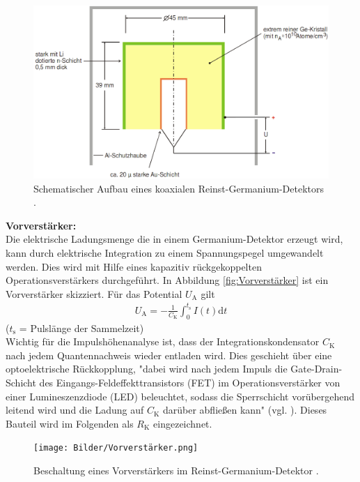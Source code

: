 \begin{figure}[H]
  \centering
  \includegraphics[width=0.9\linewidth]{Bilder/Germanium-Detektor.png}
  \caption{Schematischer Aufbau eines koaxialen Reinst-Germanium-Detektors \cite{V18}.}
  \label{fig:DetektorAufbau}
\end{figure}

\textbf{Vorverstärker:} \\
Die elektrische Ladungsmenge die in einem Germanium-Detektor erzeugt wird, kann durch elektrische Integration zu einem Spannungspegel umgewandelt werden. Dies wird mit Hilfe eines kapazitiv rückgekoppelten Operationsverstärkers durchgeführt. In Abbildung \eqref{fig:Vorverstärker} ist ein Vorverstärker skizziert. Für das Potential $U_\text{A}$ gilt
\begin{align}
  U_\text{A} = - \frac{1}{C_\text{K}} \int_{0}^{t_\text{s}} I(t) \text{d}t
\end{align}
\hfil {\footnotesize($t_\text{s}$ = Pulslänge der Sammelzeit)} \hfil \\
Wichtig für die Impulshöhenanalyse ist, dass der Integrationskondensator $C_\text{K}$ nach jedem Quantennachweis wieder entladen wird. Dies geschieht über eine optoelektrische Rückkopplung, "dabei wird nach jedem Impuls die Gate-Drain-Schicht des Eingangs-Feldeffekttransistors (FET) im Operationsverstärker von einer Lumineszenzdiode (LED) beleuchtet, sodass die Sperrschicht vorübergehend leitend wird und die Ladung auf $C_\text{K}$ darüber abfließen kann" (vgl. \cite[18]{V18}). Dieses Bauteil wird im Folgenden als $R_\text{K}$ eingezeichnet.

\begin{figure}[H]
  \centering
  \texttt{[image: Bilder/Vorverstärker.png]}
  \caption{Beschaltung eines Vorverstärkers im Reinst-Germanium-Detektor \cite{V18}.}
  \label{fig:Vorverstärker}
\end{figure}

